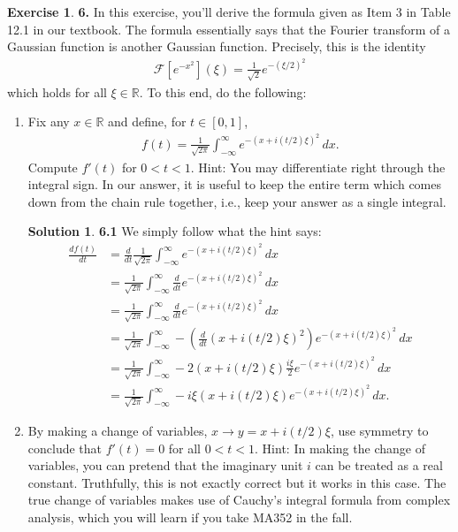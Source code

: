 \documentclass{article}
\theoremstyle{definition}
\newtheorem*{exer*}{Exercise}
\newtheorem*{sln*}{Solution}
\newcommand{\R}{\mathbb{R}}
\newcommand{\F}{\mathcal{F}}
\newcommand{\f}[2]{\frac{#1}{#2}}
\newcommand{\lp}{\left(}
\newcommand{\rp}{\right)}
\begin{document}
\begin{exer*}\textbf{6. }In this exercise, you'll derive the formula given as Item 3 in Table 12.1 in our textbook. The formula essentially says that the Fourier transform of a Gaussian function is another Gaussian function. Precisely, this is the identity
	\begin{align*}
	\F[e^{-x^2}](\xi) = \f{1}{\sqrt{2}}e^{-(\xi/2)^2}
	\end{align*}
	which holds for all $\xi \in \R$. To this end, do the following:
	
	\begin{enumerate}
		\item Fix any $x \in \R$ and define, for $t \in [0,1]$,
		\begin{align*}
		f(t) = \f{1}{\sqrt{2\pi}} \int^\infty_{-\infty} e^{-(x+ i(t/2)\xi)^2}\,dx.
		\end{align*}
		Compute $f'(t)$ for $0 < t < 1$. Hint: You may differentiate right through the integral sign. In our answer, it is useful to keep the entire term which comes down from the chain rule together, i.e., keep your answer as a single integral.
		
		\begin{sln*}\textbf{6.1}
			We simply follow what the hint says:
			\begin{align*}
			\f{df(t)}{dt} &= \f{d}{dt}\f{1}{\sqrt{2\pi}} \int^\infty_{-\infty} e^{-(x+ i(t/2)\xi)^2}\,dx\\
			&= \f{1}{\sqrt{2\pi}} \int^\infty_{-\infty} \f{d}{dt}e^{-(x+ i(t/2)\xi)^2}\,dx\\
			&= \f{1}{\sqrt{2\pi}} \int^\infty_{-\infty} \f{d}{dt}e^{-(x+ i(t/2)\xi)^2}\,dx\\
			&= \f{1}{\sqrt{2\pi}} \int^\infty_{-\infty} -\lp\f{d}{dt}(x + i(t/2)\xi)^2\rp e^{-(x + i(t/2)\xi)^2}\,dx\\
			&= \f{1}{\sqrt{2\pi}} \int^\infty_{-\infty}-2(x + i(t/2)\xi)\f{i\xi}{2} e^{-(x + i(t/2)\xi)^2}\,dx\\
			&= \f{1}{\sqrt{2\pi}} \int^\infty_{-\infty} -i\xi (x + i(t/2)\xi)e^{-(x + i(t/2)\xi)^2}\,dx.
			\end{align*}
		\end{sln*}
	
		\item By making a change of variables, $x \to y = x + i(t/2)\xi$, use symmetry to conclude that $f'(t) = 0$ for all $0 < t < 1$. Hint: In making the change of variables, you can pretend that the imaginary unit $i$ can be treated as a real constant. Truthfully, this is not exactly correct but it works in this case. The true change of variables makes use of Cauchy's integral formula from complex analysis, which you will learn if you take MA352 in the fall. 
		

\end{enumerate}
\end{exer*}
\end{document}
